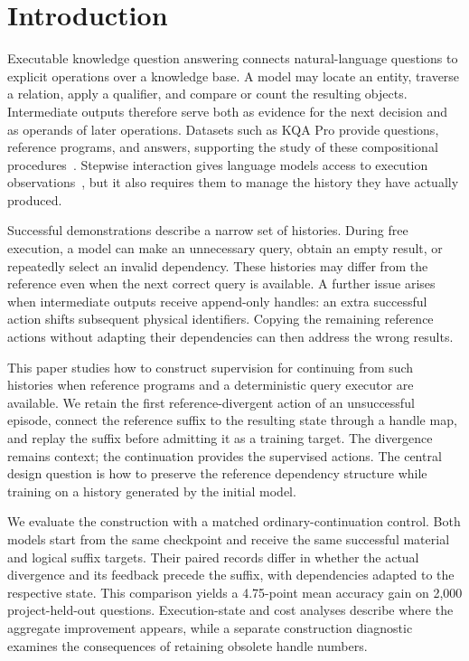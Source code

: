 \section{Introduction}

Executable knowledge question answering connects natural-language questions to explicit operations over a knowledge base. A model may locate an entity, traverse a relation, apply a qualifier, and compare or count the resulting objects. Intermediate outputs therefore serve both as evidence for the next decision and as operands of later operations. Datasets such as KQA Pro provide questions, reference programs, and answers, supporting the study of these compositional procedures~\cite{cao2022kqapro}. Stepwise interaction gives language models access to execution observations~\cite{yao2023react}, but it also requires them to manage the history they have actually produced.

Successful demonstrations describe a narrow set of histories. During free execution, a model can make an unnecessary query, obtain an empty result, or repeatedly select an invalid dependency. These histories may differ from the reference even when the next correct query is available. A further issue arises when intermediate outputs receive append-only handles: an extra successful action shifts subsequent physical identifiers. Copying the remaining reference actions without adapting their dependencies can then address the wrong results.

This paper studies how to construct supervision for continuing from such histories when reference programs and a deterministic query executor are available. We retain the first reference-divergent action of an unsuccessful episode, connect the reference suffix to the resulting state through a handle map, and replay the suffix before admitting it as a training target. The divergence remains context; the continuation provides the supervised actions. The central design question is how to preserve the reference dependency structure while training on a history generated by the initial model.

We evaluate the construction with a matched ordinary-continuation control. Both models start from the same checkpoint and receive the same successful material and logical suffix targets. Their paired records differ in whether the actual divergence and its feedback precede the suffix, with dependencies adapted to the respective state. This comparison yields a 4.75-point mean accuracy gain on 2,000 project-held-out questions. Execution-state and cost analyses describe where the aggregate improvement appears, while a separate construction diagnostic examines the consequences of retaining obsolete handle numbers.

